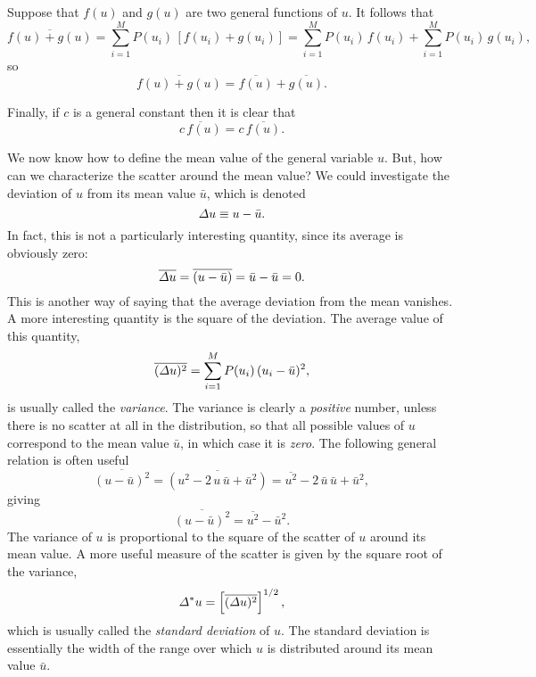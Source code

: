 Suppose that $f(u)$ and $g(u)$ are two general functions of $u$. It follows that
\begin{equation}
\overline{f(u)+g(u)} = \sum_{i=1}^{M}P(u_i)\,[f(u_i)+g(u_i)]
= \sum_{i=1}^{M}P(u_i)\,f(u_i)+ \sum_{i=1}^{M}P(u_i)\,g(u_i),
\end{equation}
so
\begin{equation}
\overline{f(u)+g(u)}= \overline{f(u)}+\overline{g(u)}.
\end{equation}


Finally, if $c$ is a general constant then it is clear  that
\begin{equation}
\overline{c \,f(u)} = c\,\overline{f(u)}.
\end{equation}

We now know how to define the mean value of the general variable $u$. 
But, how can we  characterize the scatter around the mean value?
We could investigate the deviation of $u$ from its mean value $\bar{u}$,
which is denoted
\begin{equation}
{\mit\Delta} u \equiv  u- \bar{u}.
\end{equation}
In fact, this is not a particularly interesting quantity, since its average
is obviously zero:
\begin{equation}
\overline{{\mit\Delta} u} = \overline{(u-\bar{u})} = \bar{u}-\bar{u} = 0.
\end{equation}
This is another way of saying that the average deviation from the
mean vanishes. A more interesting quantity is the square of the 
deviation. The average value of this quantity,
\begin{equation}
\overline{({\mit\Delta} u)^2} = \sum_{i=1}^M P(u_i)\,(u_i - \bar{u})^2,
\end{equation}
is usually called the
{\em variance}.
The variance is clearly a  {\em positive} number,
 unless there is no scatter at all in the
distribution, so that all possible values of $u$ correspond to the
mean value $\bar{u}$, in which case it is {\em zero}. 
The following general relation
is often useful
\begin{equation}
\overline{(u-\bar{u})^2} = \overline{(
u^2-2\,u\,\bar{u}+\bar{u}^2)}= \overline{u^2}-2\,\bar{u}\,\bar{u}+\bar{u}^2,
\end{equation}
giving
\begin{equation}
\overline{(u-\bar{u})^2}= \overline{u^2}-\bar{u}^2.
\end{equation}
The variance of $u$ 
is proportional to the square of the scatter
of $u$ around its mean value. A more useful  measure of the scatter
 is given by the square root of the variance,
\begin{equation}
{\mit\Delta}^\ast u = \left[\overline{({\mit\Delta} u)^2}\right]^{1/2},
\end{equation}
which is usually called the {\em standard deviation} of $u$. The
standard deviation is essentially the width of the range over which
$u$ is distributed around its mean value $\bar{u}$.

